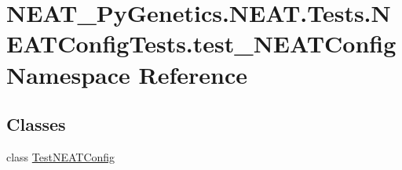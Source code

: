 \hypertarget{namespaceNEAT__PyGenetics_1_1NEAT_1_1Tests_1_1NEATConfigTests_1_1test__NEATConfig}{}\section{N\+E\+A\+T\+\_\+\+Py\+Genetics.\+N\+E\+A\+T.\+Tests.\+N\+E\+A\+T\+Config\+Tests.\+test\+\_\+\+N\+E\+A\+T\+Config Namespace Reference}
\label{namespaceNEAT__PyGenetics_1_1NEAT_1_1Tests_1_1NEATConfigTests_1_1test__NEATConfig}
\subsection*{Classes}
\begin{DoxyCompactItemize}
\item 
class \hyperlink{classNEAT__PyGenetics_1_1NEAT_1_1Tests_1_1NEATConfigTests_1_1test__NEATConfig_1_1TestNEATConfig}{Test\+N\+E\+A\+T\+Config}
\end{DoxyCompactItemize}
